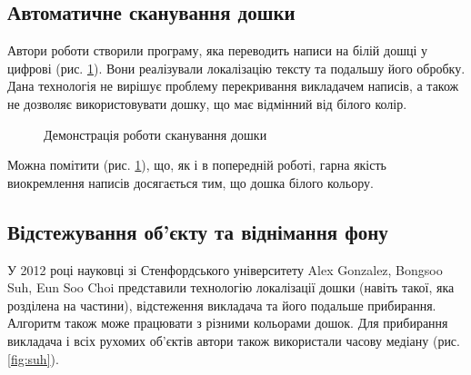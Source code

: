 \subsection{Автоматичне сканування дошки}
Автори роботи \cite{wienecke} створили програму, яка переводить написи на білій
дошці у цифрові (рис. \ref{fig:wienecke}). Вони реалізували локалізацію тексту та подальшу
його обробку. Дана технологія не вирішує проблему перекривання викладачем написів,
а також не дозволяє використовувати дошку, що має відмінний від білого колір.
\begin{figure}[H]
  \centering
  \caption{Демонстрація роботи сканування дошки \cite{wienecke}
    \label{fig:wienecke}
  }
\end{figure}
Можна помітити (рис. \ref{fig:wienecke}), що, як і в попередній роботі, гарна якість виокремлення написів
досягається тим, що дошка білого кольору.

\subsection{Відстежування об'єкту та віднімання фону}
У 2012 році науковці зі Стенфордського університету Alex Gonzalez,
Bongsoo Suh, Eun Soo Choi представили технологію \cite{suh} локалізації дошки
(навіть такої, яка розділена на частини), відстеження викладача та його
подальше прибирання. Алгоритм також може працювати з різними кольорами
дошок. Для прибирання викладача і всіх рухомих об'єктів автори також
використали часову медіану (рис. \ref{fig:suh}).

